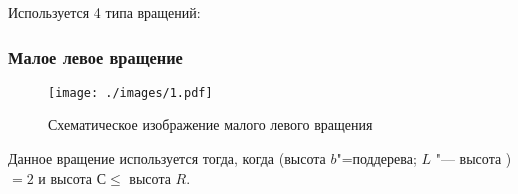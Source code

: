 \begin{frame}
    Используется 4 типа вращений:

    \frametitle{Малое левое вращение}

    \begin{figure}[ht]
        \texttt{[image: ./images/1.pdf]}
        
        \caption{Схематическое изображение малого левого вращения}    
    \end{figure}

    Данное вращение используется тогда,
    когда (высота $b$"=поддерева; $L$ "--- высота )
    $= 2$ и высота $С \leqslant$ высота $R$.

\end{frame}